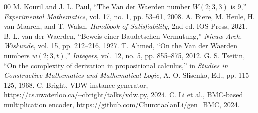 \documentclass[conference]{IEEEtran}
\begin{document}
\begin{thebibliography}{00}
 M. Kouril and J. L. Paul, ``The Van der Waerden number $W(2;3,3)$ is 9,'' \textit{Experimental Mathematics}, vol. 17, no. 1, pp. 53--61, 2008.
 A. Biere, M. Heule, H. van Maaren, and T. Walsh, \textit{Handbook of Satisfiability}, 2nd ed. IOS Press, 2021.
 B. L. van der Waerden, ``Beweis einer Baudetschen Vermutung,'' \textit{Nieuw Arch. Wiskunde}, vol. 15, pp. 212--216, 1927.
 T. Ahmed, ``On the Van der Waerden numbers $w(2;3,t)$,'' \textit{Integers}, vol. 12, no. 5, pp. 855--875, 2012.
 G. S. Tseitin, ``On the complexity of derivation in propositional calculus,'' in \textit{Studies in Constructive Mathematics and Mathematical Logic}, A. O. Slisenko, Ed., pp. 115--125, 1968.
 C. Bright, VDW instance generator, \url{https://cs.uwaterloo.ca/~cbright/talks/vdw.py}, 2024.
 C. Li et al., BMC-based multiplication encoder, \url{https://github.com/ChunxiaolanLi/gen_BMC}, 2024.
\end{thebibliography}
\end{document}
